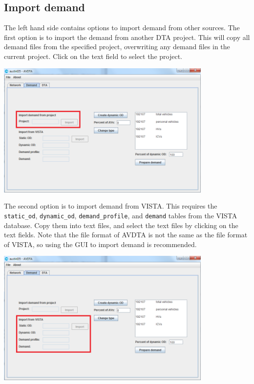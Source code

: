 \subsection{Import demand}
The left hand side contains options to import demand from other sources. The first option is to import the demand from another DTA project. This will copy all demand files from the specified project, overwriting any demand files in the current project. Click on the text field to select the project.
\begin{center}
\includegraphics[width=0.8\textwidth]{images/demand1.png}
\end{center}

The second option is to import demand from VISTA. This requires the \texttt{static\_od}, \texttt{dynamic\_od}, \texttt{demand\_profile}, and \texttt{demand} tables from the VISTA database. Copy them into text files, and select the text files by clicking on the text fields. Note that the file format of AVDTA is not the same as the file format of VISTA, so using the GUI to import demand is recommended.
\begin{center}
\includegraphics[width=0.8\textwidth]{images/demand2.png}
\end{center}

